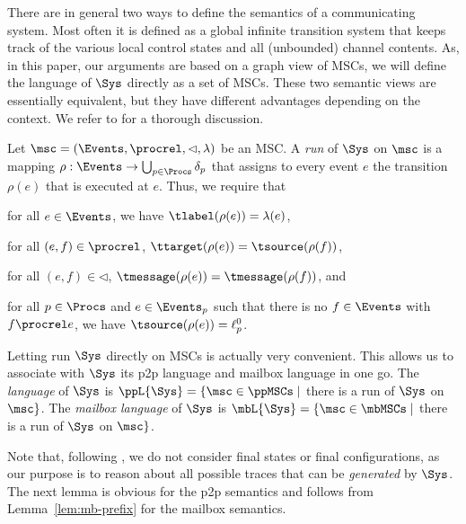 There are in general two ways to define the semantics of a communicating system.
Most often it is defined as a global infinite transition system that keeps track
of the various local control states and all (unbounded) channel contents.
As, in this paper, our arguments are based on a graph view of MSCs, we will define
the language of $\Sys$ directly as a set of MSCs. These two semantic views are essentially
equivalent, but they have different advantages depending on the context.
We refer to \cite{CyriacG14} for a thorough discussion.

Let $\msc = (\Events,\procrel,\lhd,\lambda)$ be an MSC.
A \emph{run} of $\Sys$ on $\msc$ is a mapping
$\rho: \Events \to \bigcup_{p \in \Procs} \delta_p$
that assigns to every event $e$ the transition $\rho(e)$
that is executed at $e$. Thus, we require that
\begin{enumerate*}[label={(\roman*)}]
\item for all $e \in \Events$, we have $\tlabel(\rho(e)) = \lambda(e)$,
\item for all $(e,f) \in {\procrel}$, $\ttarget(\rho(e)) = \tsource(\rho(f))$,
\item for all $(e,f) \in {\lhd}$, $\tmessage(\rho(e)) = \tmessage(\rho(f))$,
and
\item for all $p \in \Procs$ and $e \in \Events_p$ such that there is no $f \in \Events$ with $f \procrel e$, we have $\tsource(\rho(e)) = \ell_p^0$.
\end{enumerate*}

Letting run $\Sys$ directly on MSCs is actually very convenient.
This allows us to associate with $\Sys$ its p2p language and mailbox language
in one go. The \emph{\pp language} of $\Sys$ is $\ppL{\Sys} = \{\msc \in \ppMSCs \mid$ there is a run of $\Sys$ on $\msc\}$.
The \emph{mailbox language} of $\Sys$ is $\mbL{\Sys} = \{\msc \in \mbMSCs \mid$ there is a run of $\Sys$ on $\msc\}$.

Note that, following \cite{DBLP:conf/cav/BouajjaniEJQ18,DBLP:conf/fossacs/GiustoLL20},
we do not consider final states or final configurations, as our purpose is to
reason about all possible
traces that can be \emph{generated} by $\Sys$.
The next lemma is obvious for the p2p semantics and follows from Lemma~\ref{lem:mb-prefix} for
	the mailbox semantics.

